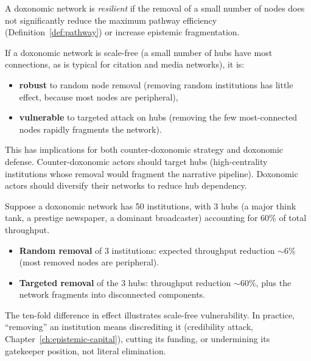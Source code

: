 \begin{definition}
\label{def:resilience}
A doxonomic network is \emph{resilient} if the removal of a small number of nodes does not significantly reduce the maximum pathway efficiency (Definition~\ref{def:pathway}) or increase epistemic fragmentation.
\end{definition}

\begin{proposition}
\label{prop:scale-free}
If a doxonomic network is scale-free (a small number of hubs have most connections, as is typical for citation and media networks), it is:
\begin{itemize}[nosep]
  \item \textbf{robust} to random node removal (removing random institutions has little effect, because most nodes are peripheral),
  \item \textbf{vulnerable} to targeted attack on hubs (removing the few most-connected nodes rapidly fragments the network).
\end{itemize}
\end{proposition}

This has implications for both counter-doxonomic strategy and doxonomic defense.
Counter-doxonomic actors should target hubs (high-centrality institutions whose removal would fragment the narrative pipeline).
Doxonomic actors should diversify their networks to reduce hub dependency.

\begin{example}
\label{ex:disruption}
Suppose a doxonomic network has 50 institutions, with 3 hubs (a major think tank, a prestige newspaper, a dominant broadcaster) accounting for 60\% of total throughput.
\begin{itemize}[nosep]
  \item \textbf{Random removal} of 3 institutions: expected throughput reduction $\sim 6\%$ (most removed nodes are peripheral).
  \item \textbf{Targeted removal} of the 3 hubs: throughput reduction $\sim 60\%$, plus the network fragments into disconnected components.
\end{itemize}
The ten-fold difference in effect illustrates scale-free vulnerability.
In practice, ``removing'' an institution means discrediting it (credibility attack, Chapter~\ref{ch:epistemic-capital}), cutting its funding, or undermining its gatekeeper position, not literal elimination.
\end{example}


